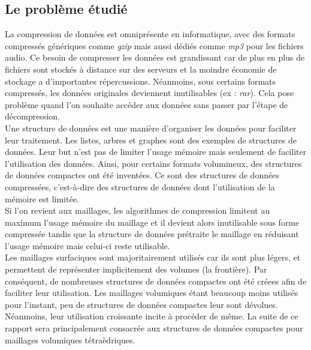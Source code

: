 \subsection*{Le problème étudié}
\noindent
La compression de données est omniprésente en informatique, avec des formats compressés génériques comme \textit{gzip} mais aussi dédiés comme \textit{mp3} pour les fichiers audio. Ce besoin de compresser les données est grandissant car de plus en plus de fichiers sont stockés à distance sur des serveurs et la moindre économie de stockage a d'importantes répercussions. Néanmoins, sous certains formats compressés, les données originales deviennent inutilisables (ex : \textit{rar}). Cela pose problème quand l'on souhaite accéder aux données  sans passer par l'étape de décompression.\\
Une structure de données est une manière d'organiser les données pour faciliter leur traitement. Les listes, arbres et graphes sont des exemples de structures de données. Leur but n'est pas de limiter l'usage mémoire mais seulement de faciliter l'utilisation des données. Ainsi, pour certains formats volumineux, des structures de données compactes ont été inventées. Ce sont des structures de données compressées, c'est-à-dire des structures de données dont l'utilisation de la mémoire est limitée.\\
Si l'on revient aux maillages, les algorithmes de compression limitent au maximum l'usage mémoire du maillage et il devient alors inutilisable sous forme compressée tandis que la structure de données prétraite le maillage en réduisant l'usage mémoire mais celui-ci reste utilisable.\\ 
Les maillages surfaciques sont majoritairement utilisés car ils sont plus légers, et permettent de représenter implicitement des volumes (la frontière). Par conséquent, de nombreuses structures de données compactes ont été créees afin de faciliter leur utilisation. Les maillages volumiques étant beaucoup moins utilisés pour l'instant, peu de structures de données compactes leur sont dévolues. Néanmoins, leur utilisation croissante incite à procéder de même. La suite de ce rapport sera principalement consacrée aux structures de données compactes pour maillages volumiques tétraèdriques.

